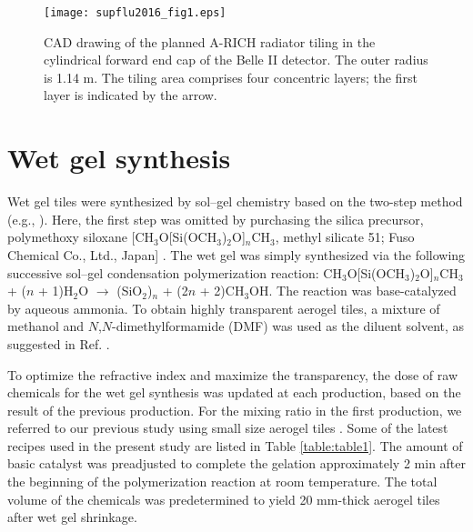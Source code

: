 \documentclass[5p,twocolumn]{elsarticle}
\begin{document}
\begin{figure}[t]
\centering 
\texttt{[image: supflu2016\_fig1.eps]}
\caption{CAD drawing of the planned A-RICH radiator tiling in the cylindrical forward end cap of the Belle II detector. The outer radius is 1.14 m. The tiling area comprises four concentric layers; the first layer is indicated by the arrow.}
\label{fig:fig1}
\end{figure}


\section{Wet gel synthesis}
\label{2}

Wet gel tiles were synthesized by sol--gel chemistry based on the two-step method (e.g., \cite{cite17}). Here, the first step was omitted by purchasing the silica precursor, polymethoxy siloxane [CH$_3$O[Si(OCH$_3$)$_2$O]$_n$CH$_3$, methyl silicate 51; Fuso Chemical Co., Ltd., Japan] \cite{cite8}. The wet gel was simply synthesized via the following successive sol--gel condensation polymerization reaction: CH$_3$O[Si(OCH$_3$)$_2$O]$_n$CH$_3$ + ($n$ + 1)H$_2$O $\to $ (SiO$_2$)$_n$ + (2$n$ + 2)CH$_3$OH. The reaction was base-catalyzed by aqueous ammonia. To obtain highly transparent aerogel tiles, a mixture of methanol and $N$,$N$-dimethylformamide (DMF) was used as the diluent solvent, as suggested in Ref. \cite{cite9}.

To optimize the refractive index and maximize the transparency, the dose of raw chemicals for the wet gel synthesis was updated at each production, based on the result of the previous production. For the mixing ratio in the first production, we referred to our previous study using small size aerogel tiles \cite{cite9}. Some of the latest recipes used in the present study are listed in Table \ref{table:table1}. The amount of basic catalyst was preadjusted to complete the gelation approximately 2 min after the beginning of the polymerization reaction at room temperature. The total volume of the chemicals was predetermined to yield 20 mm-thick aerogel tiles after wet gel shrinkage.
\end{document}
